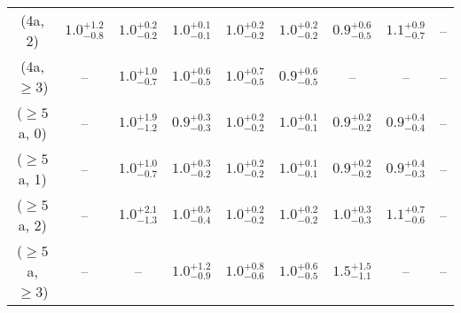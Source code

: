 \begin{table}[h!]
{\begin{tabular}{ccccccccc}
	(4a, 2) & $1.0^{+ 1.2 }_{- 0.8 }$ & $1.0^{+ 0.2 }_{- 0.2 }$ & $1.0^{+ 0.1 }_{- 0.1 }$ & $1.0^{+ 0.2 }_{- 0.2 }$ & $1.0^{+ 0.2 }_{- 0.2 }$ & $0.9^{+ 0.6 }_{- 0.5 }$ & $1.1^{+ 0.9 }_{- 0.7 }$ & -- \\[0.5ex] 
	(4a, $\ge3$) & -- & $1.0^{+ 1.0 }_{- 0.7 }$ & $1.0^{+ 0.6 }_{- 0.5 }$ & $1.0^{+ 0.7 }_{- 0.5 }$ & $0.9^{+ 0.6 }_{- 0.5 }$ & -- & -- & -- \\[0.5ex] 
	($\ge5$a, 0) & -- & $1.0^{+ 1.9 }_{- 1.2 }$ & $0.9^{+ 0.3 }_{- 0.3 }$ & $1.0^{+ 0.2 }_{- 0.2 }$ & $1.0^{+ 0.1 }_{- 0.1 }$ & $0.9^{+ 0.2 }_{- 0.2 }$ & $0.9^{+ 0.4 }_{- 0.4 }$ & -- \\[0.5ex] 
	($\ge5$a, 1) & -- & $1.0^{+ 1.0 }_{- 0.7 }$ & $1.0^{+ 0.3 }_{- 0.2 }$ & $1.0^{+ 0.2 }_{- 0.2 }$ & $1.0^{+ 0.1 }_{- 0.1 }$ & $0.9^{+ 0.2 }_{- 0.2 }$ & $0.9^{+ 0.4 }_{- 0.3 }$ & -- \\[0.5ex] 
	($\ge5$a, 2) & -- & $1.0^{+ 2.1 }_{- 1.3 }$ & $1.0^{+ 0.5 }_{- 0.4 }$ & $1.0^{+ 0.2 }_{- 0.2 }$ & $1.0^{+ 0.2 }_{- 0.2 }$ & $1.0^{+ 0.3 }_{- 0.3 }$ & $1.1^{+ 0.7 }_{- 0.6 }$ & -- \\[0.5ex] 
	($\ge5$a, $\ge3$) & -- & -- & $1.0^{+ 1.2 }_{- 0.9 }$ & $1.0^{+ 0.8 }_{- 0.6 }$ & $1.0^{+ 0.6 }_{- 0.5 }$ & $1.5^{+ 1.5 }_{- 1.1 }$ & -- & -- \\[0.5ex] 
	\hline
	\hline
\end{tabular}}
\end{table}
